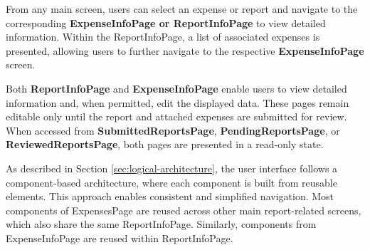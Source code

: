 From any main screen, users can select an expense or report and navigate to the corresponding \textbf{ExpenseInfoPage or ReportInfoPage} to view detailed information. Within the ReportInfoPage, a list of associated expenses is presented, allowing users to further navigate to the respective \textbf{ExpenseInfoPage} screen.
 
Both \textbf{ReportInfoPage} and \textbf{ExpenseInfoPage} enable users to view detailed information and, when permitted, edit the displayed data. These pages remain editable only until the report and attached expenses are submitted for review. When accessed from \textbf{SubmittedReportsPage}, \textbf{PendingReportsPage}, or \textbf{ReviewedReportsPage}, both pages are presented in a read-only state.

As described in Section \ref{sec:logical-architecture}, the user interface follows a component-based architecture, where each component is built from reusable elements. This approach enables consistent and simplified navigation. Most components of ExpensesPage are reused across other main report-related screens, which also share the same ReportInfoPage. Similarly, components from ExpenseInfoPage are reused within ReportInfoPage.


